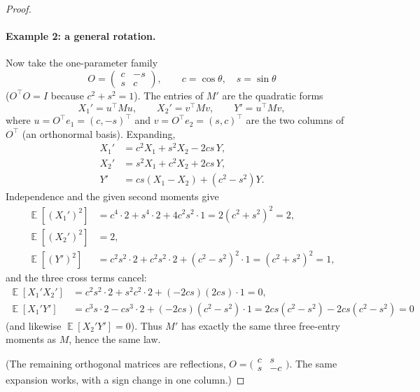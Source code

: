 \documentclass[11pt,a4paper]{article}
\DeclareMathOperator{\E}{\mathbb{E}}
\begin{document}
\begin{proof}
\paragraph{Example 2: a general rotation.}
Now take the one-parameter family
\[
O
=
\begin{pmatrix} c & -s \\ s & c \end{pmatrix},
\qquad
c=\cos\theta,\quad s=\sin\theta
\]
(\(O^\top O=I\) because \(c^2+s^2=1\)). The entries of \(M'\) are the quadratic forms
\[
X_1'
=
u^\top M u,
\qquad
X_2'
=
v^\top M v,
\qquad
Y'
=
u^\top M v,
\]
where \(u=O^\top e_1=(c,-s)^\top\) and \(v=O^\top e_2=(s,c)^\top\) are the two columns of \(O^\top\) (an orthonormal basis). Expanding,
\begin{align*}
X_1'
&=
c^2 X_1 + s^2 X_2 - 2cs\, Y,\\
X_2'
&=
s^2 X_1 + c^2 X_2 + 2cs\, Y,\\
Y'
&=
cs(X_1-X_2)+(c^2-s^2)Y.
\end{align*}
Independence and the given second moments give
\begin{align*}
\E[(X_1')^2]
&=
c^4\cdot 2 + s^4\cdot 2 + 4c^2s^2\cdot 1
=
2(c^2+s^2)^2
=
2,\\
\E[(X_2')^2]
&=
2,\\
\E[(Y')^2]
&=
c^2s^2\cdot 2 + c^2s^2\cdot 2 + (c^2-s^2)^2\cdot 1
=
(c^2+s^2)^2
=
1,
\end{align*}
and the three cross terms cancel:
\begin{align*}
\E[X_1'X_2']
&=
c^2s^2\cdot 2 + s^2c^2\cdot 2 + (-2cs)(2cs)\cdot 1
=
0,\\
\E[X_1'Y']
&=
c^3s\cdot 2 - cs^3\cdot 2 + (-2cs)(c^2-s^2)\cdot 1
=
2cs(c^2-s^2)-2cs(c^2-s^2)
=
0
\end{align*}
(and likewise \(\E[X_2'Y']=0\)). Thus \(M'\) has exactly the same three free-entry moments as \(M\), hence the same law.

(The remaining orthogonal matrices are reflections, \(O=\bigl(\begin{smallmatrix}c&s\\s&-c\end{smallmatrix}\bigr)\). The same expansion works, with a sign change in one column.)


\end{proof}
\end{document}
